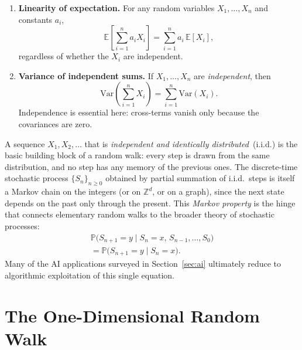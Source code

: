 \documentclass[conference,a4paper,10pt]{IEEEtran}
\begin{document}
\begin{enumerate}
\item \textbf{Linearity of expectation.} For any random variables
$X_{1},\dots,X_{n}$ and constants $a_{i}$,
\begin{equation}
\mathbb{E}\!\left[\sum_{i=1}^{n}a_{i}X_{i}\right]
=\sum_{i=1}^{n}a_{i}\,\mathbb{E}[X_{i}],
\label{eq:linexp}
\end{equation}
regardless of whether the $X_{i}$ are independent.
\item \textbf{Variance of independent sums.} If $X_{1},\dots,X_{n}$ are
\emph{independent}, then
\begin{equation}
\mathrm{Var}\!\left(\sum_{i=1}^{n}X_{i}\right)
=\sum_{i=1}^{n}\mathrm{Var}(X_{i}).
\label{eq:varsum}
\end{equation}
Independence is essential here: cross-terms vanish only because the
covariances are zero.
\end{enumerate}

A sequence $X_{1},X_{2},\dots$ that is \emph{independent and identically
distributed}~(i.i.d.) is the basic building block of a random walk: every
step is drawn from the same distribution, and no step has any memory of
the previous ones. The discrete-time stochastic process
$\{S_{n}\}_{n\geq 0}$ obtained by partial summation of i.i.d.\ steps is
itself a Markov chain on the integers (or on $\mathbb{Z}^{d}$, or on a
graph), since the next state depends on the past only through the present.
This \emph{Markov property} is the hinge that connects elementary random
walks to the broader theory of stochastic processes:
\begin{multline}
\mathbb{P}\bigl(S_{n+1}=y\mid S_{n}=x,\,S_{n-1},\dots,S_{0}\bigr)\\
=\mathbb{P}\bigl(S_{n+1}=y\mid S_{n}=x\bigr).
\end{multline}
Many of the AI applications surveyed in Section~\ref{sec:ai} ultimately
reduce to algorithmic exploitation of this single equation.

\section{The One-Dimensional Random Walk}\label{sec:1d}
\end{document}
